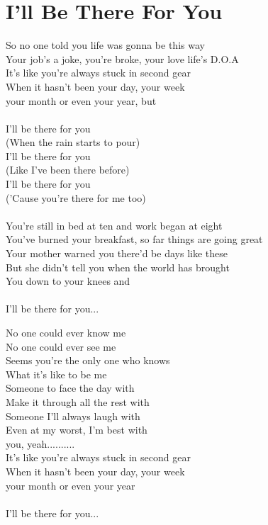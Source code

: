 \section{I'll Be There For You}
So no one told you life was gonna be this way\\
Your job's a joke, you're broke, your love life's D.O.A\\
It's like you're always stuck in second gear\\
When it hasn't been your day, your week\\
your month or even your year, but\\
\\
I'll be there for you\\
(When the rain starts to pour)\\
I'll be there for you\\
(Like I've been there before)\\
I'll be there for you\\
('Cause you're there for me too)\\
\\
You're still in bed at ten and work began at eight\\
You've burned your breakfast, so far things are going great\\
Your mother warned you there'd be days like these\\
But she didn't tell you when the world has brought \\
You down to your knees and\\
\\
I'll be there for you...
\begin{multicols}{2}
No one could ever know me\\
No one could ever see me\\
Seems you're the only one who knows \\
What it's like to be me\\
Someone to face the day with\\
Make it through all the rest with\\
Someone I'll always laugh with\\
Even at my worst, I'm best with\\
you, yeah..........
\columnbreak
\\
It's like you're always stuck in second gear\\
When it hasn't been your day, your week\\
your month or even your year\\
\\
I'll be there for you...\\
\end{multicols}